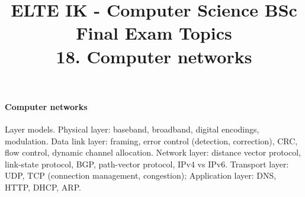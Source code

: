 \documentclass[margin=0px]{article}
\title{\textbf{{\Large ELTE IK - Computer Science BSc} \vspace{0.2cm} \\ {\huge Final Exam Topics}} \vspace{0.3cm} \\ 18. Computer networks}
\author{}
\date{}
\newenvironment{tetel}[1]{\paragraph{#1 \\}}{}
\begin{document}
\maketitle

\begin{center}
\end{center}

\begin{tetel}{Computer networks}
    Layer models. Physical layer: baseband, broadband, digital encodings, modulation. Data link layer: framing, error control (detection, correction), CRC, flow control, dynamic channel allocation. Network layer: distance vector protocol, link-state protocol, BGP, path-vector protocol, IPv4 vs IPv6. Transport layer: UDP, TCP (connection management, congestion); Application layer: DNS, HTTP, DHCP, ARP.
\end{tetel}
\end{document}
